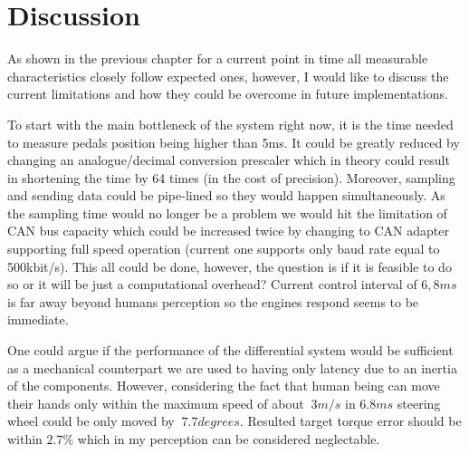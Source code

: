 



\chapter{Discussion}
As shown in the previous chapter for a current point in time all measurable characteristics closely follow expected ones, however, I would like to discuss the current limitations and how they could be overcome in future implementations.

To start with the main bottleneck of the system right now, it is the time needed to measure pedals position being higher than 5ms. It could be greatly reduced by changing an analogue/decimal conversion prescaler which in theory could result in shortening the time by 64 times (in the cost of precision). Moreover, sampling and sending data could be pipe-lined so they would happen simultaneously. As the sampling time would no longer be a problem we would hit the limitation of CAN bus capacity which could be increased twice by changing to CAN adapter supporting full speed operation (current one supports only baud rate equal to 500kbit/s). This all could be done, however, the question is if it is feasible to do so or it will be just a computational overhead? Current control interval of $6,8ms$ is far away beyond humans perception  so the engines respond seems to be immediate. 

One could argue if the performance of the differential system would be sufficient as a mechanical counterpart we are used to having only latency due to an inertia of the components. However, considering the fact that human being can move their hands only within the maximum speed of about $~3m/s$ \cite{human_reaction_time} in $6.8ms$ steering wheel could be only moved by $~7.7 degrees$. Resulted target torque error should be within $2.7\%$ which in my perception can be considered neglectable.

